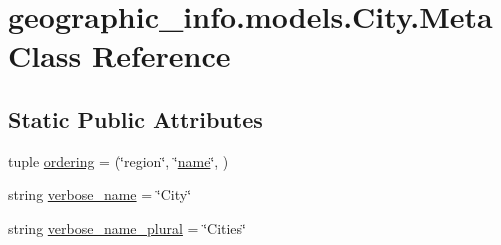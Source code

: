 \hypertarget{classgeographic__info_1_1models_1_1_city_1_1_meta}{\section{geographic\-\_\-info.\-models.\-City.\-Meta Class Reference}
\label{classgeographic__info_1_1models_1_1_city_1_1_meta}
}
\subsection*{Static Public Attributes}
\begin{DoxyCompactItemize}
\item 
tuple \hyperlink{classgeographic__info_1_1models_1_1_city_1_1_meta_a324ac8e51af2ab2a771aec417b0a5153}{ordering} = (\char`\"{}region\char`\"{}, \char`\"{}\hyperlink{classgeographic__info_1_1models_1_1_city_aa090c90b7b44f3ea7665fc898b7b5ed7}{name}\char`\"{}, )
\item 
string \hyperlink{classgeographic__info_1_1models_1_1_city_1_1_meta_a5b82185ab92ff515a86ed1482d0037ba}{verbose\-\_\-name} = \char`\"{}City\char`\"{}
\item 
string \hyperlink{classgeographic__info_1_1models_1_1_city_1_1_meta_aa241fa97475f8ecd08dbce2cc4e3d4a3}{verbose\-\_\-name\-\_\-plural} = \char`\"{}Cities\char`\"{}
\end{DoxyCompactItemize}


